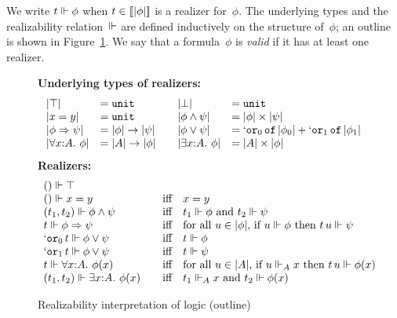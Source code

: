 We write $t \Vdash \phi$ when $t \in [\![|\phi|]\!]$ is a
realizer for~$\phi$. The underlying types and the realizability
relation~$\Vdash$ are defined inductively on the structure of~$\phi$; an
outline is shown in Figure~\ref{fig:rz-logic}. We say that a
formula~$\phi$ is \emph{valid} if it has at least one realizer.
%
\begin{figure}[t]
  \textbf{Underlying types of realizers:}
\[
  \begin{array}{ll@{\qquad}ll}
    \typeOf{\itrue} &= \mathtt{unit} &
    \typeOf{\ifalse} &= \mathtt{unit} \\
    \typeOf{\iequal{x}{y}} &= \mathtt{unit} &
    \typeOf{\iand{\phi}{\psi}} &= \oprod{\typeOf{\phi}}{\typeOf{\psi}} \\
    \typeOf{\iimply{\phi}{\psi}} &= \oarrow{\typeOf{\phi}}{\typeOf{\psi}} &
    \typeOf{\ior{\phi}{\psi}} &=
    \osumtyx{\mathtt{or}_0}{\typeOf{\phi_0}}{\mathtt{or}_1}{\typeOf{\phi_1}} \\
    \typeOf{\iforall{x}{A}{\phi}} &= \oarrow{\typeOf{A}}{\typeOf{\phi}} &
    \typeOf{\iexists{x}{A}{\phi}} &= \oprod{\typeOf{A}}{\typeOf{\phi}}
  \end{array}
\]
  \textbf{Realizers:}
\[
  \begin{array}{ll}
    () \Vdash \top & \\
    () \Vdash x = y
    &\quad\text{iff}\quad 
    x = y
    \\
    (t_1,t_2) \Vdash \phi\land \psi
    &\quad\text{iff}\quad
    \text{$t_1 \Vdash \phi$ and $t_2 \Vdash \psi$}
    \\
    t \Vdash \phi\Rightarrow \psi
    &\quad\text{iff}\quad
    \text{for all $u \in |\phi|$, if $u \Vdash \phi$ then $t\,u
      \Vdash \psi$}
    \\
    `\mathtt{or}_0\,t \Vdash \phi\lor \psi
    &\quad\text{iff}\quad
    \text{$t \Vdash \phi$}
    \\
    `\mathtt{or}_1\,t \Vdash \phi\lor \psi
    &\quad\text{iff}\quad
    \text{$t \Vdash \psi$}
    \\
    t \Vdash \forall x{:}A.\ \phi(x)
    &\quad\text{iff}\quad
    \text{for all $u \in |A|$, if $u \Vdash_A x$ then $t\,u \Vdash \phi(x)$}
    \\
    (t_1, t_2) \Vdash \exists x{:}A.\ \phi(x)
    &\quad\text{iff}\quad
    \text{$t_1 \Vdash_A x$ and $t_2 \Vdash \phi(x)$}
  \end{array}
\]
  \caption{Realizability interpretation of logic (outline)}
  \label{fig:rz-logic}
\end{figure}

